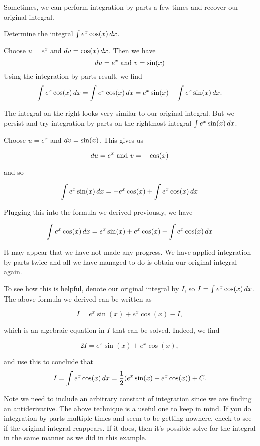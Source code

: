 \documentclass[noauthor]{ximera}
\begin{document}
Sometimes, we can perform integration by parts a few times and recover our original integral.

\begin{example}
Determine the integral $\int e^{x}\cos(x) \mathop{}\!d x$.
\begin{explanation}

Choose $u=e^{x}$ and $\mathop{}\!d v=\cos(x) \mathop{}\!d x$. 
Then we have 
\[
\mathop{}\!d u =e^{x} \text{ and }  v=\sin(x) 
\]
Using the integration by parts result, we find
\[
\int e^{x}\cos(x) \mathop{}\!d x = \int e^{x} \cos(x) \mathop{}\!d x= e^{x} \sin(x) - \int e^{x} \sin(x) \mathop{}\!d x.
\]

The integral on the right looks very similar to our original integral. But we persist and try integration by parts on the rightmost integral $\int e^{x} \sin(x) \mathop{}\!d x$. 

Choose $u=e^{x}$ and $\mathop{}\!d v= \sin(x)$. 
This gives us 

\[
\mathop{}\!d u=e^{x} \text{ and } v=-\cos(x)
\]

and so 

\[
\int e^{x}\sin(x) \mathop{}\!d x= -e^{x}\cos(x) + \int e^{x} \cos(x) \mathop{}\!d x
\]

Plugging this into the formula we derived previously, we have

\[ 
\int e^{x} \cos(x) \mathop{}\!d x=e^{x} \sin(x)+e^{x} \cos(x) - \int e^{x} \cos(x) \mathop{}\!d x
\]

It may appear that we have not made any progress. We have applied integration by parts twice and all we have managed to do is obtain our original integral again.

To see how this is helpful, denote our original integral by $I$, so $I=\int e^{x} \cos(x) \mathop{}\!d x$. The above formula we derived can be written as 

\[
 I = e^{x} \sin(x) +e^{x} \cos(x) -I,
\] 

which is an algebraic equation in $I$ that can be solved. Indeed, we find

\[
 2I = e^{x} \sin(x) +e^{x} \cos(x),
\] 

and use this to conclude that
\[
 I=\int e^{x}\cos(x) \mathop{}\!d x= \frac{1}{2} ( e^{x} \sin(x) +e^{x} \cos(x) ) + C.
\]

Note we need to include an arbitrary constant of integration since we are finding an antiderivative. The above technique is a useful one to keep in mind. If you do integration by parts multiple times and seem to be getting nowhere, check to see if the original integral reappears.  If it does, then it's possible solve for the integral in the same manner as we did in this example. 
\end{explanation}
\end{example}
\end{document}
